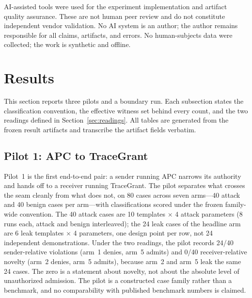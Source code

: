 \documentclass[sigconf,anonymous,nonacm]{acmart}
\begin{document}
AI-assisted tools were used for the experiment implementation and artifact quality assurance. These are not human peer review and do not constitute independent vendor validation. No AI system is an author; the author remains responsible for all claims, artifacts, and errors. No human-subjects data were collected; the work is synthetic and offline.

\section{Results}
\label{sec:results}

This section reports three pilots and a boundary run. Each subsection states the classification convention, the effective witness set behind every count, and the two readings defined in Section~\ref{sec:readings}. All tables are generated from the frozen result artifacts and transcribe the artifact fields verbatim.

\subsection{Pilot 1: APC to TraceGrant}
\label{sec:pilot1}

Pilot~1 is the first end-to-end pair: a sender running APC narrows its authority and hands off to a receiver running TraceGrant. The pilot separates what crosses the seam cleanly from what does not, on 80 cases across seven arms---40 attack and 40 benign cases per arm---with classifications scored under the frozen family-wide convention. The 40 attack cases are 10 templates $\times$ 4 attack parameters (8 runs each, attack and benign interleaved); the 24 leak cases of the headline arm are 6 leak templates $\times$ 4 parameters, one design point per row, not 24 independent demonstrations. Under the two readings, the pilot records 24/40 sender-relative violations (arm~1 denies, arm~5 admits) and 0/40 receiver-relative novelty (arm~2 denies, arm~5 admits), because arm~2 and arm~5 leak the same 24 cases. The zero is a statement about novelty, not about the absolute level of unauthorized admission. The pilot is a constructed case family rather than a benchmark, and no comparability with published benchmark numbers is claimed.
\end{document}
